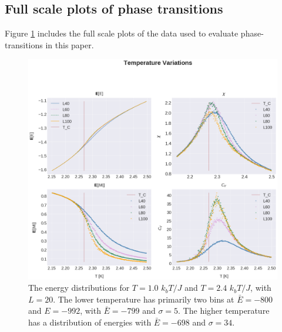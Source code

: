\documentclass[%
reprint,nofootinbib,
amsmath,amssymb,
aps,
]{revtex4-1}
\begin{document}
\subsection{Full scale plots of phase transitions}
Figure \ref{4C4} includes the full scale plots of the data used to evaluate phase-transitions in this paper. 
\begin{figure}[H]
	\includegraphics[width = \textwidth]{Figures/plot4.png} 
	\caption{ \label{4C4} The energy distributions for $T = 1.0$ $k_bT/J$ and $T = 2.4$ $k_bT/J$, with $L=20$. The lower temperature has primarily two bins at $\bar{E} = -800$ and $E = -992$, with $\bar{E}= -799$ and $\sigma = 5$. The higher temperature has a distribution of energies with $\bar{E}=  -698$ and $\sigma = 34$. \vspace{10mm}}
\end{figure} 

 
\end{document}
